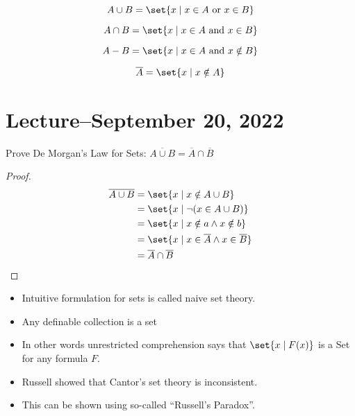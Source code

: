 \begin{definition}
	\[
		A \cup B = \set{x\mid x\in A \text{ or } x\in B}
	\]
\end{definition}

\begin{definition}[Intersection]
	\[
		A \cap B = \set{x\mid x\in A \text{ and } x\in B}
	\]
\end{definition}

\begin{definition}[Difference]
	\[
		A - B = \set{x\mid x\in A \text{ and } x\notin B}
	\]
\end{definition}

\begin{definition}[Complement]
	\[
		\overline{A} = \set{x\mid x\notin A}
	\]
\end{definition}

\section{Lecture--September 20, 2022}

Prove De Morgan's Law for Sets: $\overline{A\cup B} = \overline{A}\cap \overline{B}$

\begin{proof}
	\begin{align}
		\overline{A\cup B} & = \set{x\mid x\notin A\cup B}                             \\
		                   & = \set{x \mid \neg(x\in A\cup B)}                         \\
		                   & = \set{x \mid x \notin a \land x\notin b}                 \\
		                   & = \set{x \mid x \in \overline{A} \land x\in \overline{B}} \\
		                   & = \overline{A}\cap \overline{B}
	\end{align}
\end{proof}

\begin{itemize}
	\item Intuitive formulation for sets is called naive set theory.
	\item Any definable collection is a set
	\item In other words unrestricted comprehension says that $\set{x\mid F(x)}$ is a Set
	      for any formula $F$.
	\item Russell showed that Cantor's set theory is inconsistent.
	\item This can be shown using so-called ``Russell's Paradox''.
\end{itemize}

